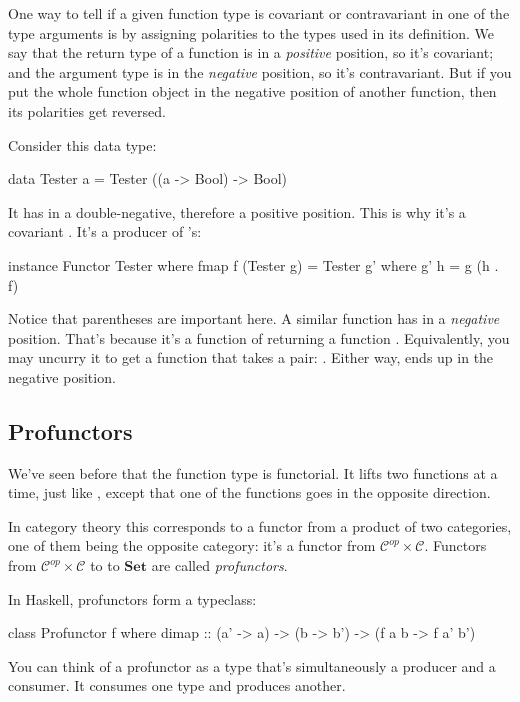\documentclass[DaoFP]{subfiles}
\begin{document}
One way to tell if a given function type is covariant or contravariant in one of the type arguments is by assigning polarities to the types used in its definition. We say that the return type of a function is in a \emph{positive} position, so it's covariant; and the argument type is in the \emph{negative} position, so it's contravariant. But if you put the whole function object in the negative position of another function, then its polarities get reversed. 

Consider this data type:
\begin{haskell}
data Tester a = Tester ((a -> Bool) -> Bool)
\end{haskell}
It has  in a double-negative, therefore a positive position. This is why it's a covariant . It's a producer of 's:

\begin{haskell}
instance Functor Tester where
  fmap f (Tester g) = Tester g'
    where g' h = g (h . f)
\end{haskell}

Notice that parentheses are important here. A similar function  has  in a \emph{negative} position. That's because it's a function of  returning a function . Equivalently, you may uncurry it to get a function that takes a pair: . Either way,  ends up in the negative position.

\subsection{Profunctors}

We've seen before that the function type is functorial. It lifts two functions at a time, just like , except that one of the functions goes in the opposite direction. 

In category theory this corresponds to a functor from a product of two categories, one of them being the opposite category: it's a functor from $\mathcal{C}^{op} \times \mathcal{C}$. Functors from $\mathcal{C}^{op} \times \mathcal{C}$ to  to $\mathbf{Set}$ are called \emph{profunctors}.

In Haskell, profunctors form a typeclass:
\begin{haskell}
class Profunctor f where
  dimap :: (a' -> a) -> (b -> b') -> (f a b -> f a' b')
\end{haskell}

You can think of a profunctor as a type that's simultaneously a producer and a consumer. It consumes one type and produces another.
\end{document}
